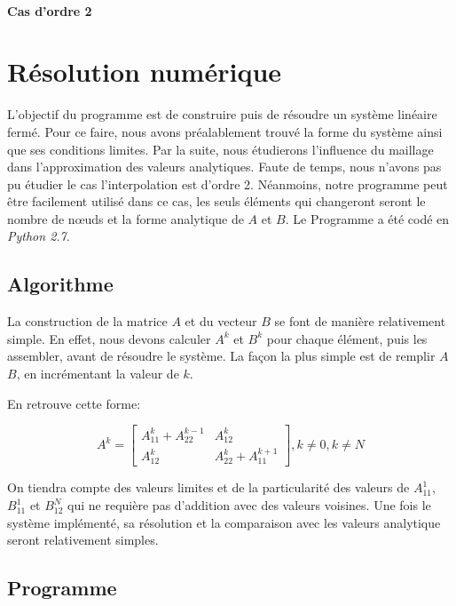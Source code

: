 \documentclass[a4paper,10pt]{report} %
\begin{document}
\subsubsection{Cas d'ordre 2}

\chapter{Résolution numérique} %

L'objectif du programme est de construire puis de résoudre un système linéaire fermé. Pour ce faire, nous avons préalablement trouvé la forme du système ainsi que ses conditions limites.
Par la suite, nous étudierons l'influence du maillage dans l'approximation des valeurs analytiques. Faute de temps, nous n'avons pas pu étudier le cas l'interpolation est d'ordre 2. Néanmoins, notre programme peut être facilement utilisé dans ce cas, les seuls éléments qui changeront seront le nombre de nœuds et la forme analytique de $A$ et $B$.
Le Programme a été codé en \textit{Python 2.7}.


\section{Algorithme}

La construction de la matrice $A$ et du vecteur $B$ se font de manière relativement simple. En effet, nous devons calculer $A^k$ et $B^k$ pour chaque élément, puis les assembler, avant de résoudre le système.
La façon la plus simple est de remplir $A$ $B$, en incrémentant la valeur de $k$.

En retrouve cette forme:

$$A^k =\begin{bmatrix}
A^k_11 + A^{k-1}_22 & A^k_12 \\
A^k_12 & A^k_22 + A^{k+1}_11
\end{bmatrix}, k \neq 0, k \neq N$$

On tiendra compte des valeurs limites et de la particularité des valeurs de $A^1_{11}$,$B^1_{11}$ et $B^N_{12}$ qui ne requière pas d'addition avec des valeurs voisines.
Une fois le système implémenté, sa résolution et la comparaison avec les valeurs analytique seront relativement simples.

\section{Programme}
\end{document}
